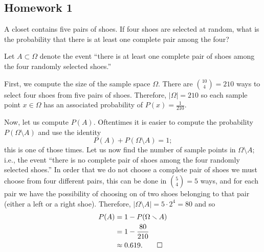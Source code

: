 \subsection{Homework 1}
\begin{problem}[Handout 1, \# 5]
  A closet contains five pairs of shoes. If four shoes are selected at
  random, what is the probability that there is at least one complete pair
  among the four?
\end{problem}
\begin{solution*}
  Let \(A\subset\Omega\) denote the event ``there is at least one complete
  pair of shoes among the four randomly selected shoes.''

  First, we compute the size of the sample space \(\Omega\). There are
  \(\binom{10}{4}=210\) ways to select four shoes from five pairs of
  shoes. Therefore, \(|\Omega|=210\) so each sample point \(x\in\Omega\)
  has an associated probability of \(P(x)=\frac{1}{210}\).

  Now, let us compute \(P(A)\). Oftentimes it is easier to compute the
  probability \(P(\Omega\setminus A)\) and use the identity
  \[
    P(A)+P(\Omega\setminus A)=1;
  \]
  this is one of those times. Let us now find the number of sample points
  in \(\Omega\setminus A\); i.e., the event ``there is no complete pair of
  shoes among the four randomly selected shoes.'' In order that we do not
  choose a complete pair of shoes we must choose from four different pairs,
  this can be done in \(\binom{5}{4}=5\) ways, and for each pair we have
  the possibility of choosing on of two shoes belonging to that pair
  (either a left or a right shoe). Therefore,
  \(|\Omega\setminus A|=5\cdot 2^4=80\) and so
  \begin{align*}
    P(A)
    &=1-P(\Omega\setminus A)\\
    &=1-\frac{80}{210}\\
    &\approx0.619.\qedhere
  \end{align*}
\end{solution*}


